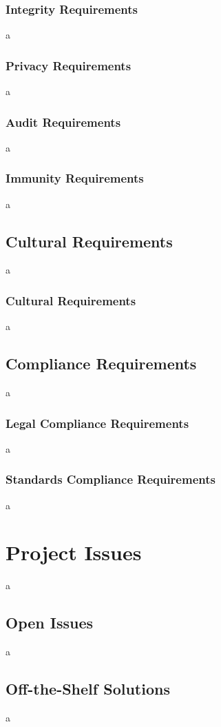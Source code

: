 \documentclass[12pt]{article}
\begin{document}
\subsubsection{Integrity Requirements}
a
\subsubsection{Privacy Requirements}
a

\subsubsection{Audit Requirements}
a

\subsubsection{Immunity Requirements}
a

\subsection{Cultural Requirements}
a

\subsubsection{Cultural Requirements}
a

\subsection{Compliance Requirements}
a

\subsubsection{Legal Compliance Requirements}
a

\subsubsection{Standards Compliance Requirements}
a

\section{Project Issues}
a

\subsection{Open Issues}
a

\subsection{Off-the-Shelf Solutions}
a
\end{document}
